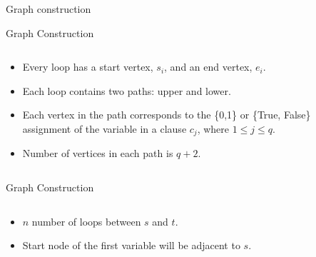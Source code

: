 \documentclass[xcolor=dvipsnames]{beamer}
\begin{document}
\begin{section}{Graph construction }
\begin{frame}{Graph Construction}
\begin{columns}
\begin{column}{0.45\textwidth}
\begin{itemize}
\item Every loop has a start vertex, $s_i$, and an end vertex, $e_i$. 
\item Each loop contains two paths: upper and lower.
\item Each vertex in the path corresponds 
to the \{0,1\} or \{True, False\} assignment of the variable in a clause $c_j$, where $1 \leq j \leq q$.
\item Number of vertices in each path is $q+2$.%
\end{itemize}
\end{column}
\begin{column}{0.55\textwidth}
    \begin{overlayarea}{0.55\textwidth}{8cm}
        
    \end{overlayarea}
\end{column}
\end{columns}
\end{frame}


\begin{frame}{Graph Construction}
\begin{columns}
\begin{column}{0.45\textwidth}
\begin{itemize}
\item $n$ number of loops between $s$ and $t$.
\item Start node of the first variable will be adjacent to $s$.
\end{itemize}
\end{column}
\begin{column}{0.55\textwidth}
    \begin{overlayarea}{0.55\textwidth}{8cm}
    \end{overlayarea}
\end{column}
\end{columns}
\end{frame}


\end{section}
\end{document}
